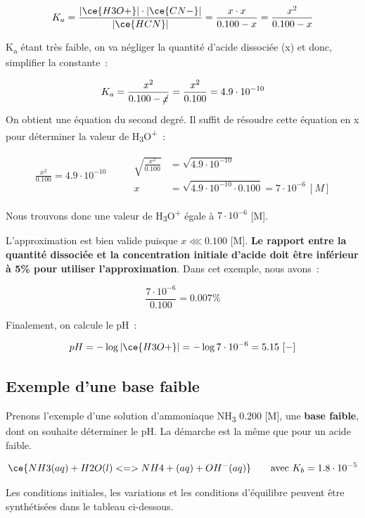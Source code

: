 \documentclass[
  11pt,
  a4paper,
  openany]{book}
\begin{document}
\[
K_a = \frac{|\ce{H3O+}| \cdot |\ce{CN-}|}{|\ce{HCN}|} = \frac{x \cdot x}{0.100 - x} = \frac{x^2}{0.100 - x}
\]

K\textsubscript{a} étant très faible, on va négliger la quantité d'acide dissociée (x) et donc, simplifier la constante~:

\[
K_a = \frac{x^2}{0.100 - \cancel{x}} = \frac{x^2}{0.100} = 4.9 \cdot 10^{-10}
\]

On obtient une équation du second degré. Il suffit de résoudre cette équation en x pour déterminer la valeur de \textbar H\textsubscript{3}O\textsuperscript{+}\textbar~:

\[
\begin{split}
\frac{x^2}{0.100} = 4.9 \cdot 10^{-10}
\end{split}
\qquad
\begin{split}
\sqrt{\frac{x^2}{0.100}} &= \sqrt{4.9 \cdot 10^{-10}} \\
x &= \sqrt{4.9 \cdot 10^{-10} \cdot 0.100} = 7 \cdot 10^{-6}\ [M]
\end{split}
\]

Nous trouvons donc une valeur de \textbar H\textsubscript{3}O\textsuperscript{+}\textbar{} égale à \(7 \cdot 10^{-6}\) {[}M{]}.

L'approximation est bien valide puisque \(x \lll 0.100\) {[}M{]}. \textbf{Le rapport entre la quantité dissociée et la concentration initiale d'acide doit être inférieur à 5\% pour utiliser l'approximation}. Dans cet exemple, nous avons~:

\[
\frac{7 \cdot 10^{-6}}{0.100} = 0.007\%
\]

Finalement, on calcule le pH~:

\[
pH = - \log |\ce{H3O+}| = - \log 7 \cdot 10^{-6} = 5.15\ [-]
\]

\hypertarget{exemple-dune-base-faible}{%
\subsection{Exemple d'une base faible}\label{exemple-dune-base-faible}}

Prenons l'exemple d'une solution d'ammoniaque NH\textsubscript{3} 0.200 {[}M{]}, une \textbf{base faible}, dont on souhaite déterminer le pH. La démarche est la même que pour un acide faible.

\[
\ce{NH3(aq) + H2O(l) <=> NH4+(aq) + OH^{-}(aq)} \qquad \text{avec } K_b = 1.8 \cdot 10^{-5}
\]

Les conditions initiales, les variations et les conditions d'équilibre peuvent être synthétisées dans le tableau ci-dessous.
\end{document}
